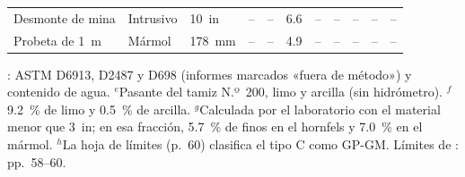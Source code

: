 \documentclass[11pt,letterpaper]{article}
\begin{document}
\begin{table}[H]
\begin{tabular}{L{2.8cm}L{1.8cm}L{1.3cm}rrrlL{1.35cm}rrr}
Desmonte de mina \citep[p.~93]{w2024} & Intrusivo & 10~in & -- & -- & 6.6 & -- & -- & -- & -- & -- \\
Probeta de 1~m \citep[anexo, p.~3]{g2012} & Mármol & 178~mm & -- & -- & 4.9 & -- & -- & -- & -- & -- \\
\bottomrule\end{tabular}\par\vspace{3pt}\footnotesize \citet{anddes2024}: ASTM D6913, D2487 y D698 (informes marcados «fuera de método») y contenido de agua. $^{e}$Pasante del tamiz N.º~200, limo y arcilla (sin hidrómetro). $^{f}$9.2~\% de limo y 0.5~\% de arcilla. $^{g}$Calculada por el laboratorio con el material menor que 3~in; en esa fracción, 5.7~\% de finos en el hornfels y 7.0~\% en el mármol. $^{h}$La hoja de límites (p.~60) clasifica el tipo C como GP-GM. Límites de \citet{g2021}: pp.~58--60.\end{table}
\end{document}
